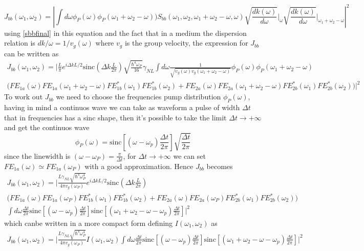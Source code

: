 \[J_{bb}(\omega_1,\omega_2) = \left|\int d\omega \phi_P(\omega)\phi_P(\omega_1 + \omega_2 - \omega))S_{bb}(\omega_1,\omega_2,\omega_1+\omega_2-\omega,\omega)\sqrt{ \frac{dk(\omega)}{d\omega}}\Bigg|_{\omega}\sqrt{\frac{dk(\omega)}{d\omega}}\Bigg|_{\omega_1+\omega_2-\omega} \right|^2\]
using \eqref{sbbfinal} in this equation and the fact that in a medium the dispersion relation is $dk/\omega = 1/v_g(\omega)$ where $v_g$ is the group velocity, the expression for $J_{bb}$ can be written as
\begin{multline}J_{bb}(\omega_1,\omega_2) = \Bigg|\frac{L}{\pi}e^{i\Delta k L/2} \text{sinc}\left(\Delta k \frac{L}{2\pi}\right) \sqrt{\frac{\hbar^4\omega_P}{16}}\gamma_{NL}\int d\omega \frac{1}{\sqrt{v_g(\omega)v_g(\omega_1+\omega_2 - \omega)}}\phi_P(\omega)\phi_P(\omega_1 + \omega_2 - \omega)\\ \Big( FE_{1a}(\omega)FE_{1a}(\omega_1+\omega_2-\omega)FE^*_{1b}(\omega_1)FE^*_{1b}(\omega_2) + FE_{2a}(\omega)FE_{2a}(\omega_1 + \omega_2-\omega)FE^*_{2b}(\omega_1)FE^*_{2b}(\omega_2)\Big)\Bigg|^2 \end{multline}
To work out $J_{bb}$ we need to choose the frequencies pump distribution $\phi_{P}(\omega)$, having in mind a continuos wave we can take as waveform a pulse of width $\Delta t$ that in frequencies has a sinc shape, then it's possible to take the limit $\Delta t \to +\infty$ and get the continuos wave
\[\phi_P(\omega) = \text{sinc}\left[(\omega-\omega_p) \frac{\Delta t}{2\pi} \right]\sqrt{\frac{\Delta t}{2\pi}}\]
since the linewidth is $(\omega - \omega_P)= \frac{\pi}{\Delta t}$, for $\Delta t \to +\infty$ we can set $FE_{1a}(\omega) \simeq FE_{1a}(\omega_P)$ with a good approximation. Hence $J_{bb}$ becomes
\begin{multline}J_{bb}(\omega_1,\omega_2) = \Bigg|\frac{L\gamma_{NL}\sqrt{\hbar^4\omega_P^4}}{4\pi v_g(\omega_P)}e^{i\Delta k L/2} \text{sinc}\left(\Delta k \frac{L}{2\pi}\right)\\ \Big( FE_{1a}(\omega)FE_{1a}(\omega_P)FE^*_{1b}(\omega_1)FE^*_{1b}(\omega_2) + FE_{2a}(\omega)FE_{2a}(\omega_P)FE^*_{2b}(\omega_1)FE^*_{2b}(\omega_2)\Big) \\ \int d\omega  \frac{\Delta t}{2\pi}\text{sinc}\left[(\omega-\omega_p) \frac{\Delta t}{2\pi} \right]\text{sinc}\left[(\omega_1+\omega_2-\omega-\omega_p) \frac{\Delta t}{2\pi} \right]\Bigg|^2\end{multline}
which canbe written in a more compact form defining $I(\omega_1,\omega_2)$ as
\begin{multline}J_{bb}(\omega_1,\omega_2) = \Bigg|\frac{L\gamma_{NL}\sqrt{\hbar^4\omega_P^4}}{4\pi v_g(\omega_P)}I(\omega_1,\omega_2) \int d\omega  \frac{\Delta t}{2\pi}\text{sinc}\left[(\omega-\omega_p) \frac{\Delta t}{2\pi} \right]\text{sinc}\left[(\omega_1+\omega_2-\omega-\omega_p) \frac{\Delta t}{2\pi} \right]\Bigg|^2\end{multline}
